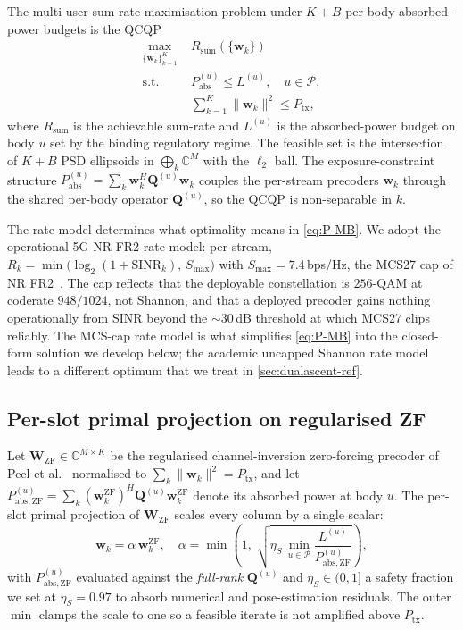 \documentclass[journal,twocolumn,10pt]{IEEEtran}
\theoremstyle{plain}
\theoremstyle{remark}
\newcommand{\ww}{\mathbf{w}}
\newcommand{\Pabs}{P_{\mathrm{abs}}}
\newcommand{\Qmat}{\mathbf{Q}}
\newcommand{\WW}{\mathbf{W}}
\newcommand{\PabsZF}{P_{\mathrm{abs},\mathrm{ZF}}}
\newcommand{\Complex}{\mathbb{C}}
\newcommand{\AllBodies}{\mathcal{P}}
\begin{document}
The multi-user sum-rate maximisation problem under $K + B$ per-body
absorbed-power budgets is the QCQP
\begin{equation}\label{eq:P-MB}
\begin{aligned}
  \max_{\{\ww_k\}_{k=1}^K} \;& R_{\mathrm{sum}}(\{\ww_k\}) \\
  \text{s.t.}\;& \Pabs^{(u)} \leq L^{(u)},\quad u \in \AllBodies,\\
  & \sum_{k=1}^K \|\ww_k\|^2 \leq P_{\mathrm{tx}},
\end{aligned}
\end{equation}
where $R_{\mathrm{sum}}$ is the achievable sum-rate and $L^{(u)}$
is the absorbed-power budget on body $u$ set by the binding
regulatory regime. The feasible set is the intersection of
$K + B$ PSD ellipsoids in $\bigoplus_k \Complex^M$ with the
$\ell_2$ ball. The exposure-constraint structure $\Pabs^{(u)} =
\sum_k \ww_k^H \Qmat^{(u)} \ww_k$ couples the per-stream precoders
$\ww_k$ through the shared per-body operator $\Qmat^{(u)}$, so the
QCQP is non-separable in $k$.

The rate model determines what optimality means in
\cref{eq:P-MB}. We adopt the operational 5G NR FR2 rate model:
per stream, $R_k = \min\bigl(\log_2(1 + \mathrm{SINR}_k),\,
S_{\max}\bigr)$ with $S_{\max} = 7.4\,$bps/Hz, the MCS27 cap of NR
FR2~\cite{TS38214MCS}. The cap reflects that the deployable
constellation is $256$-QAM at coderate $948/1024$, not Shannon, and
that a deployed precoder gains nothing operationally from SINR
beyond the $\sim 30\,$dB threshold at which MCS27 clips reliably.
The MCS-cap rate model is what simplifies \cref{eq:P-MB} into the
closed-form solution we develop below; the academic uncapped
Shannon rate model leads to a different optimum that we treat in
\cref{sec:dualascent-ref}.

\subsection{Per-slot primal projection on regularised ZF}\label{sec:primal-projection}

Let $\WW_{\mathrm{ZF}} \in \Complex^{M \times K}$ be the regularised
channel-inversion zero-forcing precoder of Peel et
al.~\cite{PeelHochwald2005} normalised to $\sum_k \|\ww_k\|^2 =
P_{\mathrm{tx}}$, and let $\PabsZF^{(u)} = \sum_k
(\ww_k^{\mathrm{ZF}})^H \Qmat^{(u)} \ww_k^{\mathrm{ZF}}$ denote its
absorbed power at body $u$. The per-slot primal projection of
$\WW_{\mathrm{ZF}}$ scales every column by a single scalar:
\begin{equation}\label{eq:primal-projection}
  \boxed{\;
  \ww_k = \alpha\,\ww_k^{\mathrm{ZF}},
  \quad
  \alpha = \min\!\left(1,\;
    \sqrt{\eta_S\,\min_{u \in \AllBodies}
      \frac{L^{(u)}}{\PabsZF^{(u)}}}
  \right),\;}
\end{equation}
with $\PabsZF^{(u)}$ evaluated against the
\emph{full-rank} $\Qmat^{(u)}$ and $\eta_S \in (0, 1]$ a safety
fraction we set at $\eta_S = 0.97$ to absorb numerical and
pose-estimation residuals. The outer $\min$ clamps the scale to
one so a feasible iterate is not amplified above $P_{\mathrm{tx}}$.
\end{document}
